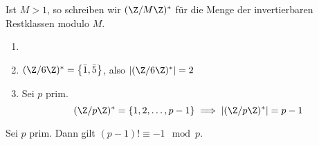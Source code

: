 \begin{notat*}
	Ist $M > 1$, so schreiben wir \( (\Z / M\Z)^* \) für die Menge der invertierbaren Restklassen modulo $M$.
\end{notat*}

\begin{exmp*}
	\begin{enumerate}
		\item[]
		\item \( (\Z/6\Z)^* = \left\{\bar{1},\bar{5}\right\} \), also \( |(\Z/6\Z)^*| = 2 \)
		\item Sei $p$ prim.
		\[ (\Z/p\Z)^* = \{1, 2, \dotsc, p-1 \} \implies |(\Z/p\Z)^*| = p-1 \]
	\end{enumerate}
\end{exmp*}

\begin{lem}\autolabel
	Sei $p$ prim. Dann gilt \( (p-1)! \equiv -1 \mod p. \)
\end{lem}